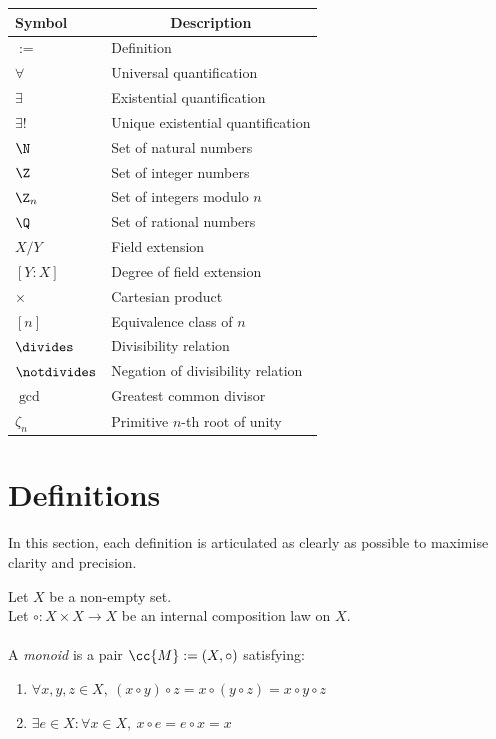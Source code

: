 \begin{tabular}{>{\centering}m{1.8cm} m{5.8cm}}
\toprule
\textbf{Symbol} & \multicolumn{1}{c}{\textbf{Description}} \\
\midrule
$:=$   & Definition \\
$\forall$ & Universal quantification \\
$\exists$ & Existential quantification \\
$\exists!$ & Unique existential quantification \\
$\N$ & Set of natural numbers \\
$\Z$ & Set of integer numbers \\
$\Z_n$ & Set of integers modulo $n$ \\
$\Q$ & Set of rational numbers \\
$X/Y$ & Field extension \\
$[Y:X]$ & Degree of field extension \\
$\times$ & Cartesian product \\
$[n]$ & Equivalence class of $n$ \\
$\divides$ & Divisibility relation \\
$\notdivides$ & Negation of divisibility relation \\
$\gcd$ & Greatest common divisor \\
$\zeta_n$ & Primitive $n$-th root of unity \\
\bottomrule
\end{tabular}

\newpage
\section{Definitions}

In this section, each definition is articulated as clearly as possible to maximise clarity and precision.

\begin{definition-pre}[Monoid]
    \label{def:monoid}
    Let $X$ be a non-empty set.\\
    Let $\circ: X\times X \to X$ be an internal composition law on $X$. \\\\
    A \textit{monoid} is a pair $\cc{M}:= (X, \circ)$ satisfying:
    \begin{enumerate}
        \item [\textbf{(A)}] $\forall x,y,z\in X,\ (x\circ y)\circ z= x\circ (y\circ z) = x\circ y \circ z$
        \item [\textbf{(N)}] $\exists e \in X : \forall x \in X,\ x\circ e = e \circ x = x$
    \end{enumerate}
\end{definition-pre}


